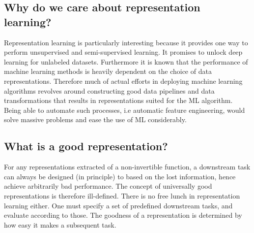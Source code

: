 \documentclass[../../thesis.tex]{subfiles}
\begin{document}







\subsection{Why do we care about representation learning?}
Representation learning is particularly interesting because it provides one way to perform unsupervised and semi-supervised learning. It promises to unlock deep learning for unlabeled datasets. Furthermore it is known that the performance of machine learning methods is heavily dependent on the choice of data representations. Therefore much of actual efforts in deploying machine learning algorithms revolves around constructing good data pipelines and data transformations that results in representations suited for the ML algorithm. Being able to automate such processes, i.e automatic feature engineering, would solve massive problems and ease the use of ML considerably. 


\subsection{What is a good representation?}
For any representations extracted of a non-invertible function, a downstream task can always be designed (in principle) to based on the lost information, hence achieve arbitrarily bad performance. The concept of universally good representations is therefore ill-defined. There is no free lunch in representation learning either. One must specify a set of predefined downstream tasks, and evaluate according to those. The goodness of a representation is determined by how easy it makes a subsequent task.
\end{document}
